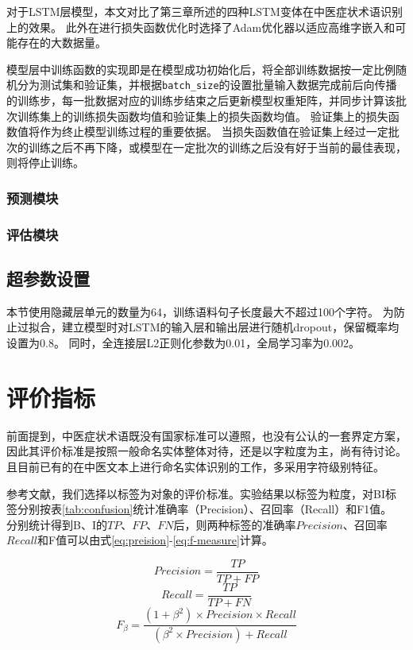 对于LSTM层模型，本文对比了第三章所述的四种LSTM变体在中医症状术语识别上的效果。
此外在进行损失函数优化时选择了Adam优化器以适应高维字嵌入和可能存在的大数据量。

模型层中训练函数的实现即是在模型成功初始化后，将全部训练数据按一定比例随机分为测试集和验证集，并根据\verb|batch_size|的设置批量输入数据完成前后向传播的训练步，每一批数据对应的训练步结束之后更新模型权重矩阵，并同步计算该批次训练集上的训练损失函数均值和验证集上的损失函数均值。
验证集上的损失函数值将作为终止模型训练过程的重要依据。
当损失函数值在验证集上经过一定批次的训练之后不再下降，或模型在一定批次的训练之后没有好于当前的最佳表现，则将停止训练。



\subsubsection{预测模块}

\subsubsection{评估模块}

\subsection{超参数设置}
本节使用隐藏层单元的数量为64，训练语料句子长度最大不超过100个字符。
为防止过拟合，建立模型时对LSTM的输入层和输出层进行随机dropout，保留概率均设置为0.8。
同时，全连接层L2正则化参数为0.01，全局学习率为0.002。

\section{评价指标}
\label{sec:tcm-pfr}
前面提到，中医症状术语既没有国家标准可以遵照，也没有公认的一套界定方案，因此其评价标准是按照一般命名实体整体对待，还是以字粒度为主，尚有待讨论。
且目前已有的在中医文本上进行命名实体识别的工作，多采用字符级别特征。

参考文献，我们选择以标签为对象的评价标准。实验结果以标签为粒度，对BI标签分别按表\ref{tab:confusion}统计准确率（Precision）、召回率（Recall）和F1值。
分别统计得到B、I的$TP$、$FP$、$FN$后，则两种标签的准确率$Precision$、召回率$Recall$和F值可以由式\ref{eq:preision}-\ref{eq:f-measure}计算。

\begin{equation}
    Precision = \frac{TP}{TP+FP} \label{eq:preision}
\end{equation}
\begin{equation}
    Recall = \frac{TP}{TP+FN}
\end{equation}
\begin{equation}
    F_\beta = \frac{(1 + \beta^2)\times Precision \times Recall}{(\beta^2\times Precision) + Recall}\label{eq:f-measure}
\end{equation}

